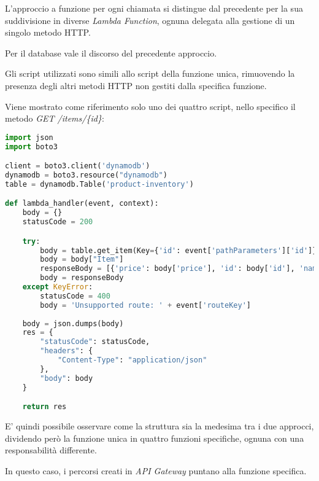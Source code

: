 L'approccio a funzione per ogni chiamata si distingue dal precedente per la sua suddivisione in diverse \textit{Lambda Function}, ognuna delegata alla gestione di un singolo metodo HTTP.

Per il database vale il discorso del precedente approccio.

Gli script utilizzati sono simili allo script della funzione unica, rimuovendo la presenza degli altri metodi HTTP non gestiti dalla specifica funzione.

Viene mostrato come riferimento solo uno dei quattro script, nello specifico il metodo \textit{GET /items/\{id\}}:
\begin{lstlisting}[language=python]
import json
import boto3

client = boto3.client('dynamodb')
dynamodb = boto3.resource("dynamodb")
table = dynamodb.Table('product-inventory')

def lambda_handler(event, context):
    body = {}
    statusCode = 200

    try:
        body = table.get_item(Key={'id': event['pathParameters']['id']})
        body = body["Item"]
        responseBody = [{'price': body['price'], 'id': body['id'], 'name': body['name'], 'description': body['description']}]
        body = responseBody
    except KeyError:
        statusCode = 400
        body = 'Unsupported route: ' + event['routeKey']
    
    body = json.dumps(body)
    res = {
        "statusCode": statusCode,
        "headers": {
            "Content-Type": "application/json"
        },
        "body": body
    }

    return res
\end{lstlisting}

E' quindi possibile osservare come la struttura sia la medesima tra i due approcci, dividendo però la funzione unica in quattro funzioni specifiche, ognuna con una responsabilità differente.

In questo caso, i percorsi creati in \textit{API Gateway} puntano alla funzione specifica.